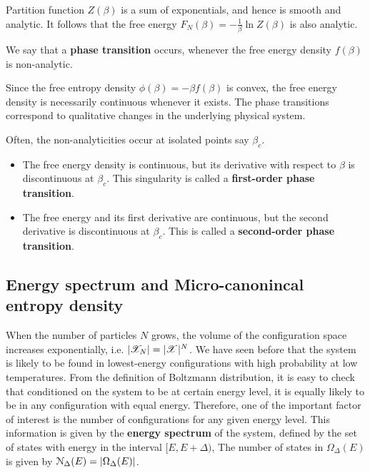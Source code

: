 \documentclass[letterpaper,english,10pt]{article}
\begin{document}
Partition function $Z (\beta)$ is a sum of exponentials, and hence is smooth and analytic. 
It follows that the free energy $F_N (\beta) = -\frac{1}{\beta}\ln Z(\beta)$ is also analytic. 
\begin{defn}
We say that a \textbf{phase transition} occurs, whenever the free energy density $f (\beta)$ is non-analytic. 
\end{defn}
Since the free entropy density $\phi (\beta) = -\beta f(\beta)$ is convex, the free energy density is necessarily continuous whenever it exists.
The phase transitions correspond to qualitative changes in the underlying physical system.
\begin{defn}
Often, the non-analyticities occur at isolated points say $\beta_c$.
\begin{itemize}
\item The free energy density is continuous, but its derivative with respect to $\beta$ is discontinuous at $\beta_c$. 
This singularity is called a \textbf{first-order phase transition}.
\item The free energy and its first derivative are continuous, but the second derivative is discontinuous at $\beta_c$. 
This is called a \textbf{second-order phase transition}.
\end{itemize}
\end{defn}


\subsection{Energy spectrum and Micro-canonincal entropy density}
When the number of particles $N$ grows, the volume of the configuration space increases exponentially, 
i.e. $|\mathscr{X}_N| = |\mathscr{X}|^N$. 
We have seen before that the system is likely to be found in lowest-energy configurations with high probability at low temperatures. 
From the definition of Boltzmann distribution, it is easy to check that conditioned on the system to be at  certain energy level, it is equally likely to be in any configuration with equal energy. 
Therefore, one of the important factor of interest is the number of configurations for any given energy level.  
This information is given by the \textbf{energy spectrum} of the system, 
defined by the set of states with energy in the interval $[E, E+\Delta)$, 
The number of states in $\Omega_\Delta(E)$ is given by $\mathcal{N}_\Delta (E) = \left\lvert\Omega_\Delta (E)\right\rvert$. 
\end{document}
